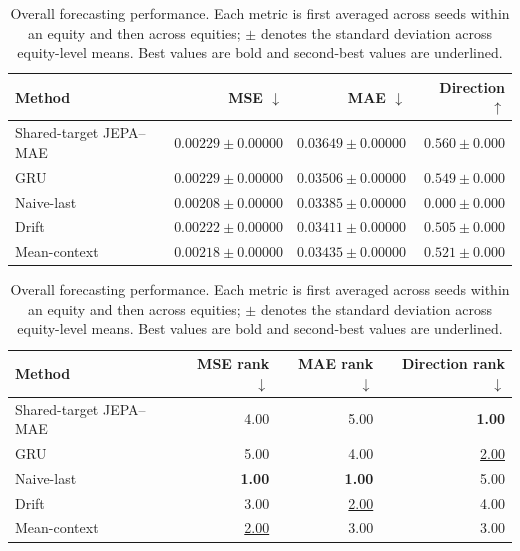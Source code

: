 \begin{table}[t]
\centering
\small
\caption{Overall forecasting performance. Each metric is first averaged across seeds within an equity and then across equities; $\pm$ denotes the standard deviation across equity-level means. Best values are bold and second-best values are underlined.}
\label{tab:main_metrics}
\begin{tabular}{lrrr}
\toprule
Method & MSE $\downarrow$ & MAE $\downarrow$ & Direction $\uparrow$ \\
\midrule
Shared-target JEPA--MAE & $0.00229 \pm 0.00000$ & $0.03649 \pm 0.00000$ & \textbf{$0.560 \pm 0.000$} \\
GRU & $0.00229 \pm 0.00000$ & $0.03506 \pm 0.00000$ & \underline{$0.549 \pm 0.000$} \\
Naive-last & \textbf{$0.00208 \pm 0.00000$} & \textbf{$0.03385 \pm 0.00000$} & $0.000 \pm 0.000$ \\
Drift & $0.00222 \pm 0.00000$ & \underline{$0.03411 \pm 0.00000$} & $0.505 \pm 0.000$ \\
Mean-context & \underline{$0.00218 \pm 0.00000$} & $0.03435 \pm 0.00000$ & $0.521 \pm 0.000$ \\
\bottomrule
\end{tabular}
\par\medskip
\begin{tabular}{lrrr}
\toprule
Method & MSE rank $\downarrow$ & MAE rank $\downarrow$ & Direction rank $\downarrow$ \\
\midrule
Shared-target JEPA--MAE & 4.00 & 5.00 & \textbf{1.00} \\
GRU & 5.00 & 4.00 & \underline{2.00} \\
Naive-last & \textbf{1.00} & \textbf{1.00} & 5.00 \\
Drift & 3.00 & \underline{2.00} & 4.00 \\
Mean-context & \underline{2.00} & 3.00 & 3.00 \\
\bottomrule
\end{tabular}
\end{table}
